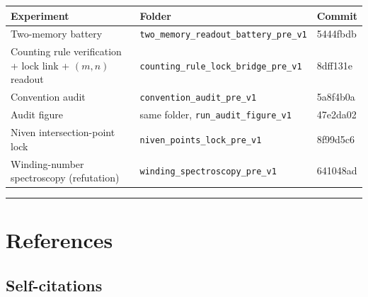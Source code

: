 \documentclass[
  a4paper,
]{article}
\newcounter{none} %
\begin{document}
{\def\LTcaptype{none} %
\begin{longtable}[]{@{}
  >{\raggedright\arraybackslash}p{}
  >{\raggedright\arraybackslash}p{}
  >{\raggedright\arraybackslash}p{}@{}}
\toprule\noalign{}
\begin{minipage}[b]{\linewidth}\raggedright
Experiment
\end{minipage} & \begin{minipage}[b]{\linewidth}\raggedright
Folder
\end{minipage} & \begin{minipage}[b]{\linewidth}\raggedright
Commit
\end{minipage} \\
\midrule\noalign{}
\endhead
\bottomrule\noalign{}
\endlastfoot
Two-memory battery & \texttt{two\_memory\_readout\_battery\_pre\_v1} &
5444fbdb \\
Counting rule verification + lock link + \((m,n)\) readout &
\texttt{counting\_rule\_lock\_bridge\_pre\_v1} & 8dff131e \\
Convention audit & \texttt{convention\_audit\_pre\_v1} & 5a8f4b0a \\
Audit figure & same folder, \texttt{run\_audit\_figure\_v1} &
47e2da02 \\
Niven intersection-point lock & \texttt{niven\_points\_lock\_pre\_v1} &
8f99d5c6 \\
Winding-number spectroscopy (refutation) &
\texttt{winding\_spectroscopy\_pre\_v1} & 641048ad \\
\end{longtable}
}

\begin{center}\rule{0.5\linewidth}{0.5pt}\end{center}

\section{References}\label{references}

\subsection{Self-citations}\label{self-citations}
\end{document}
